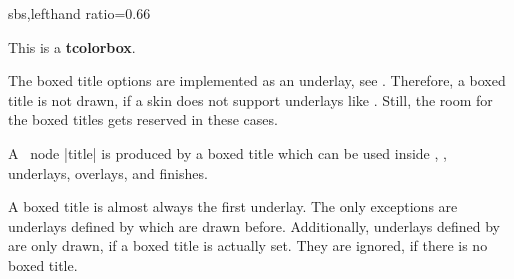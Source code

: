 \begin{dispExample*}{sbs,lefthand ratio=0.66}
\begin{tcolorbox}[enhanced,title=My title,
  attach boxed title to top left=
    {xshift=-2mm,yshift=-2mm},
  boxed title style={size=small,colback=blue},
  show bounding box]
  This is a \textbf{tcolorbox}.
\end{tcolorbox}
\end{dispExample*}


\clearpage
\begin{marker}
  The boxed title options are implemented as an underlay, see .
  Therefore, a boxed title is not drawn, if a skin does not support underlays
  like . Still, the room for the boxed
  titles gets reserved in these cases.
\end{marker}

\begin{marker}
  A \tikzname\ node |title| is produced by a boxed title which can be used
  inside , ,
  underlays, overlays, and finishes.
\end{marker}

\begin{marker}
  A boxed title is almost always the first underlay. The only exceptions are
  underlays defined by  which are drawn
  before. Additionally, underlays defined by 
  are only drawn, if a boxed title is actually set. They are ignored, if
  there is no boxed title.
\end{marker}



